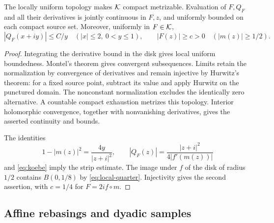 \begin{lemma}\label{lem:compact}
The locally uniform topology makes \(\mathcal K\) compact metrizable.
Evaluation of \(F,Q_F\) and all their derivatives is jointly
continuous in \(F,z\), and uniformly bounded on each compact
source set. Moreover, uniformly in \(F\in\mathcal K\),
\begin{equation}\label{eq:strip}
 |Q_F(x+iy)|\le C/y\quad(|x|\le2,\ 0<y\le1),
 \qquad |F(z)|\ge c>0\quad(|m(z)|\ge1/2).
\end{equation}
\end{lemma}
\begin{proof}
Integrating the derivative bound in the disk gives local uniform
boundedness. Montel's theorem gives convergent subsequences.
Limits retain the normalization by convergence of derivatives
and remain injective by Hurwitz's theorem: for a fixed source point,
subtract its value and apply Hurwitz on the punctured domain.
The nonconstant normalization excludes the identically zero
alternative. A countable compact exhaustion metrizes this topology.
Interior holomorphic convergence, together with nonvanishing
derivatives, gives the asserted continuity and bounds.

The identities
\[
 1-|m(z)|^2=\frac{4y}{|z+i|^2},
 \qquad |Q_F(z)|=\frac{|z+i|^2}{4|f'(m(z))|}
\]
and \eqref{eq:koebe} imply the strip estimate.
The image under \(f\) of the disk of radius \(1/2\) contains
\(B(0,1/8)\) by \eqref{eq:local-quarter}. Injectivity gives
the second assertion, with \(c=1/4\) for \(F=2i f\circ m\).
\end{proof}

\subsection{Affine rebasings and dyadic samples}

